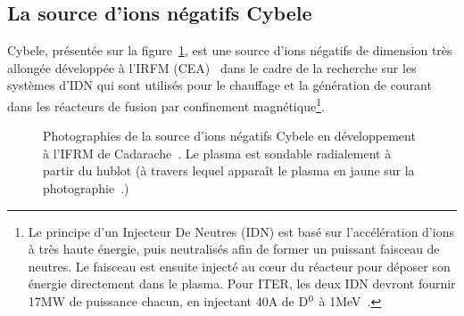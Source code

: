 \begin{refsection}
\subsection{La source d'ions négatifs Cybele}

Cybele, présentée sur la figure~\ref{4-cybelePhoto}, est une
source d'ions négatifs de dimension très allongée développée à l'IRFM
(CEA)~\cite{Simonin} dans le cadre de la recherche sur les systèmes d'IDN qui sont utilisés pour le chauffage et la génération de
courant dans les réacteurs de fusion par confinement magnétique\footnote{Le
principe d'un Injecteur De Neutres (IDN) est basé sur l'accélération d'ions à
très haute énergie, puis neutralisés afin de former un puissant faisceau de neutres.
Le faisceau est ensuite injecté au c\oe{}ur du réacteur pour déposer son énergie
directement dans le plasma. Pour ITER, les deux IDN devront fournir 17MW de
puissance chacun, en injectant 40A de D$^{{0}}$ à
1MeV~\parencite{Hemsworth}.}.

\begin{figure}[!htbp]
  \centering
    \caption{Photographies de la source d'ions négatifs Cybele en développement
    à l'IFRM de Cadarache~\parencite{SimoninHDR}. Le plasma est
    sondable radialement à partir du hublot (à travers lequel apparaît le
    plasma en jaune sur la photographie~.)
    \label{4-cybelePhoto}} 
\end{figure}	


\end{refsection}
